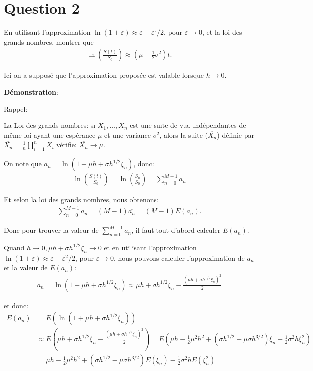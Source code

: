 \documentclass[a4paper,10pt]{report}
\begin{document}
\section{Question 2}
En utilisant l'approximation $\ln (1 + \varepsilon) \approx \varepsilon - \varepsilon^{2} / 2$, pour $\varepsilon \rightarrow 0$, et la loi des grands nombres, montrer que
\begin{align*}
	\ln(\frac{S(t)}{S_{0}}) \approx (\mu - \frac{1}{2} \sigma^{2})t.
\end{align*}
\par Ici on a supposé que l'approximation proposée est valable lorsque $h \rightarrow 0$.

\noindent \textbf{Démonstration}:
\par Rappel: 
\par La Loi des grands nombres: si $X_{1}, \dots, X_{n}$ est une suite de v.a. indépendantes de même loi ayant une espérance $\mu$ et une variance $\sigma^{2}$, alors la suite ($\overline{X_{n}}$) définie par $\overline{X_{n}} = \frac{1}{n} \prod_{i=1}^{n}X_{i}$ vérifie: $\overline{X_{n}} \rightarrow \mu$.
\par On note que $a_{n} = \ln (1 + \mu h + \sigma h^{1/2} \xi_{n})$, donc:
\begin{align*}
	\ln (\frac{S(t)}{S_{0}}) = \ln (\frac{S_{n}}{S_{0}}) = \sum_{n=0}^{M-1} a_{n}
\end{align*}
\par Et selon la loi des grands nombres, nous obtenons:
\begin{align*} 
\sum_{n=0}^{M-1} a_{n} = (M-1) \overline{a_{n}} = (M-1) E(a_{n}).
\end{align*} 
\par Donc pour trouver la valeur de $\sum_{n=0}^{M-1} a_{n}$, il faut tout d'abord calculer $E(a_{n})$.
\par Quand $h \rightarrow 0, \mu h + \sigma h^{1/2} \xi_{n} \rightarrow 0$ et en utilisant l'approximation $\ln (1 + \varepsilon) \approx \varepsilon - \varepsilon^{2} / 2$, pour $\varepsilon \rightarrow 0$, nous pouvons calculer l'approximation de $a_{n}$ et la valeur de $E(a_{n})$:
\begin{align*}
	a_{n} = \ln (1 + \mu h + \sigma h^{1/2} \xi_{n}) \approx \mu h +\sigma h^{1/2} \xi_{n} - \frac{(\mu h + \sigma h^{1/2} \xi_{n})^{2}}{2}
\end{align*}
\par et donc:
\begin{align*}
E(a_{n}) &= E(\ln (1 + \mu h + \sigma h^{1/2} \xi_{n})) \\
&\approx E(\mu h +\sigma h^{1/2} \xi_{n} - \frac{(\mu h + \sigma h^{1/2} \xi_{n})^{2}}{2}) = E(\mu h -\frac{1}{2} \mu^{2} h^{2} + (\sigma h^{1/2} - \mu \sigma h^{3/2}) \xi_{n} -\frac{1}{2} \sigma^{2} h \xi_{n}^{2})\\
&= \mu h -\frac{1}{2} \mu^{2} h^{2} + (\sigma h^{1/2} - \mu \sigma h^{3/2}) E(\xi_{n}) -\frac{1}{2} \sigma^{2} h E(\xi_{n}^{2})
\end{align*}
\end{document}
